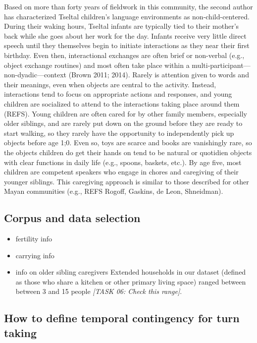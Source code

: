 \documentclass[man]{apa6}
\providecommand{\tightlist}{%
  \setlength{\itemsep}{0pt}\setlength{\parskip}{0pt}}
\theoremstyle{definition}
\theoremstyle{definition}
\theoremstyle{definition}
\theoremstyle{remark}
\begin{document}
Based on more than forty years of fieldwork in this community, the
second author has characterized Tseltal children's language environments
as non-child-centered. During their waking hours, Tseltal infants are
typically tied to their mother's back while she goes about her work for
the day. Infants receive very little direct speech until they themselves
begin to initiate interactions as they near their first birthday. Even
then, interactional exchanges are often brief or non-verbal (e.g.,
object exchange routines) and most often take place within a
multi-participant---non-dyadic---context (Brown 2011; 2014). Rarely is
attention given to words and their meanings, even when objects are
central to the activity. Instead, interactions tend to focus on
appropriate actions and responses, and young children are socialized to
attend to the interactions taking place around them (REFS). Young
children are often cared for by other family members, especially older
siblings, and are rarely put down on the ground before they are ready to
start walking, so they rarely have the opportunity to independently pick
up objects before age 1;0. Even so, toys are scarce and books are
vanishingly rare, so the objects children do get their hands on tend to
be natural or quotidien objects with clear functions in daily life
(e.g., spoons, baskets, etc.). By age five, most children are competent
speakers who engage in chores and caregiving of their younger siblings.
This caregiving approach is similar to those described for other Mayan
communities (e.g., REFS Rogoff, Gaskins, de Leon, Shneidman).

\subsection{Corpus and data selection}\label{methods-corpus}

\begin{itemize}
\tightlist
\item
  fertility info
\item
  carrying info
\item
  info on older sibling caregivers Extended households in our dataset
  (defined as those who share a kitchen or other primary living space)
  ranged between between 3 and 15 people \emph{{[}TASK 06: Check this
  range{]}}. 
\end{itemize}

\subsection{How to define temporal contingency for turn
taking}\label{how-to-define-temporal-contingency-for-turn-taking}
\end{document}
